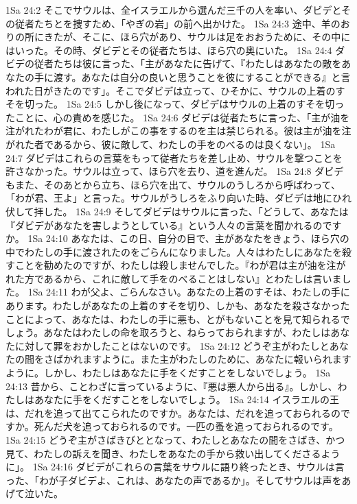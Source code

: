 1Sa 24:2  そこでサウルは、全イスラエルから選んだ三千の人を率い、ダビデとその従者たちとを捜すため、「やぎの岩」の前へ出かけた。
1Sa 24:3  途中、羊のおりの所にきたが、そこに、ほら穴があり、サウルは足をおおうために、その中にはいった。その時、ダビデとその従者たちは、ほら穴の奥にいた。
1Sa 24:4  ダビデの従者たちは彼に言った、「主があなたに告げて、『わたしはあなたの敵をあなたの手に渡す。あなたは自分の良いと思うことを彼にすることができる』と言われた日がきたのです」。そこでダビデは立って、ひそかに、サウルの上着のすそを切った。
1Sa 24:5  しかし後になって、ダビデはサウルの上着のすそを切ったことに、心の責めを感じた。
1Sa 24:6  ダビデは従者たちに言った、「主が油を注がれたわが君に、わたしがこの事をするのを主は禁じられる。彼は主が油を注がれた者であるから、彼に敵して、わたしの手をのべるのは良くない」。
1Sa 24:7  ダビデはこれらの言葉をもって従者たちを差し止め、サウルを撃つことを許さなかった。サウルは立って、ほら穴を去り、道を進んだ。
1Sa 24:8  ダビデもまた、そのあとから立ち、ほら穴を出て、サウルのうしろから呼ばわって、「わが君、王よ」と言った。サウルがうしろをふり向いた時、ダビデは地にひれ伏して拝した。
1Sa 24:9  そしてダビデはサウルに言った、「どうして、あなたは『ダビデがあなたを害しようとしている』という人々の言葉を聞かれるのですか。
1Sa 24:10  あなたは、この日、自分の目で、主があなたをきょう、ほら穴の中でわたしの手に渡されたのをごらんになりました。人々はわたしにあなたを殺すことを勧めたのですが、わたしは殺しませんでした。『わが君は主が油を注がれた方であるから、これに敵して手をのべることはしない』とわたしは言いました。
1Sa 24:11  わが父よ、ごらんなさい。あなたの上着のすそは、わたしの手にあります。わたしがあなたの上着のすそを切り、しかも、あなたを殺さなかったことによって、あなたは、わたしの手に悪も、とがもないことを見て知られるでしょう。あなたはわたしの命を取ろうと、ねらっておられますが、わたしはあなたに対して罪をおかしたことはないのです。
1Sa 24:12  どうぞ主がわたしとあなたの間をさばかれますように。また主がわたしのために、あなたに報いられますように。しかし、わたしはあなたに手をくだすことをしないでしょう。
1Sa 24:13  昔から、ことわざに言っているように、『悪は悪人から出る』。しかし、わたしはあなたに手をくだすことをしないでしょう。
1Sa 24:14  イスラエルの王は、だれを追って出てこられたのですか。あなたは、だれを追っておられるのですか。死んだ犬を追っておられるのです。一匹の蚤を追っておられるのです。
1Sa 24:15  どうぞ主がさばきびととなって、わたしとあなたの間をさばき、かつ見て、わたしの訴えを聞き、わたしをあなたの手から救い出してくださるように」。
1Sa 24:16  ダビデがこれらの言葉をサウルに語り終ったとき、サウルは言った、「わが子ダビデよ、これは、あなたの声であるか」。そしてサウルは声をあげて泣いた。
